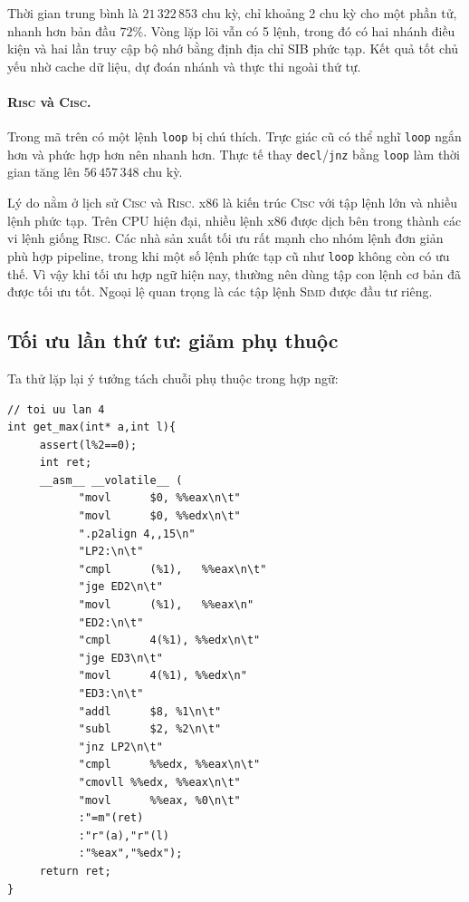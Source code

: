 \documentclass[11pt]{article}
\newcommand{\RISC}{\textsc{Risc}}
\newcommand{\CISC}{\textsc{Cisc}}
\newcommand{\SIMD}{\textsc{Simd}}
\begin{document}
Thời gian trung bình là \(21\,322\,853\) chu kỳ, chỉ khoảng 2 chu kỳ cho một
phần tử, nhanh hơn bản đầu \(72\%\). Vòng lặp lõi vẫn có 5 lệnh, trong đó có
hai nhánh điều kiện và hai lần truy cập bộ nhớ bằng định địa chỉ SIB phức tạp.
Kết quả tốt chủ yếu nhờ cache dữ liệu, dự đoán nhánh và thực thi ngoài thứ tự.

\paragraph{\RISC{} và \CISC.}
Trong mã trên có một lệnh \texttt{loop} bị chú thích. Trực giác cũ có thể nghĩ
\texttt{loop} ngắn hơn và phức hợp hơn nên nhanh hơn. Thực tế thay
\texttt{decl}/\texttt{jnz} bằng \texttt{loop} làm thời gian tăng lên
\(56\,457\,348\) chu kỳ.

Lý do nằm ở lịch sử \CISC{} và \RISC. x86 là kiến trúc \CISC{} với tập lệnh
lớn và nhiều lệnh phức tạp. Trên CPU hiện đại, nhiều lệnh x86 được dịch bên
trong thành các vi lệnh giống \RISC. Các nhà sản xuất tối ưu rất mạnh cho
nhóm lệnh đơn giản phù hợp pipeline, trong khi một số lệnh phức tạp cũ như
\texttt{loop} không còn có ưu thế. Vì vậy khi tối ưu hợp ngữ hiện nay, thường
nên dùng tập con lệnh cơ bản đã được tối ưu tốt. Ngoại lệ quan trọng là các
tập lệnh \SIMD{} được đầu tư riêng.

\subsection{Tối ưu lần thứ tư: giảm phụ thuộc}

Ta thử lặp lại ý tưởng tách chuỗi phụ thuộc trong hợp ngữ:
\begin{verbatim}
// toi uu lan 4
int get_max(int* a,int l){
     assert(l%2==0);
     int ret;
     __asm__ __volatile__ (
           "movl      $0, %%eax\n\t"
           "movl      $0, %%edx\n\t"
           ".p2align 4,,15\n"
           "LP2:\n\t"
           "cmpl      (%1),   %%eax\n\t"
           "jge ED2\n\t"
           "movl      (%1),   %%eax\n"
           "ED2:\n\t"
           "cmpl      4(%1), %%edx\n\t"
           "jge ED3\n\t"
           "movl      4(%1), %%edx\n"
           "ED3:\n\t"
           "addl      $8, %1\n\t"
           "subl      $2, %2\n\t"
           "jnz LP2\n\t"
           "cmpl      %%edx, %%eax\n\t"
           "cmovll %%edx, %%eax\n\t"
           "movl      %%eax, %0\n\t"
           :"=m"(ret)
           :"r"(a),"r"(l)
           :"%eax","%edx");
     return ret;
}
\end{verbatim}
\end{document}

